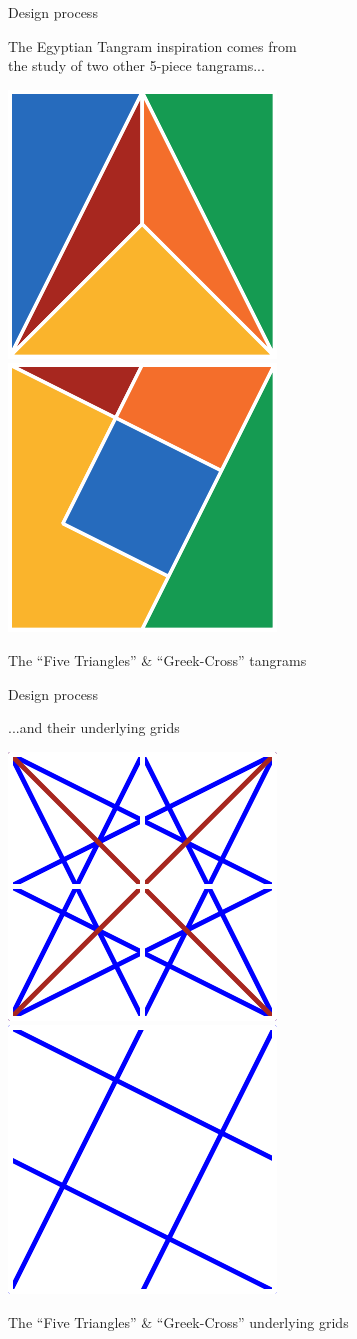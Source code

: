\documentclass[14pt]{beamer}
\begin{document}
    \begin{frame}{Design process}
        \begin{center}
            The Egyptian Tangram inspiration comes from\\the study of two other 5-piece tangrams...

            \bigskip

            \includegraphics[height=18ex]{figures/figure000a.pdf} \qquad \includegraphics[height=18ex]{figures/figure000b.pdf} \\

            \bigskip

            {\small The ``Five Triangles'' \& ``Greek-Cross'' tangrams}
        \end{center}
    \end{frame}


    \begin{frame}{Design process}
        \begin{center}
            ...and their underlying grids\\\phantom{the study of two other 5-piece tangrams...}

            \bigskip

            \includegraphics[height=18ex]{figures/figure000d.pdf} \qquad \includegraphics[height=18ex]{figures/figure000c.pdf} \\

            \bigskip

            {\small The ``Five Triangles'' \& ``Greek-Cross'' underlying grids}
        \end{center}
    \end{frame}
\end{document}
